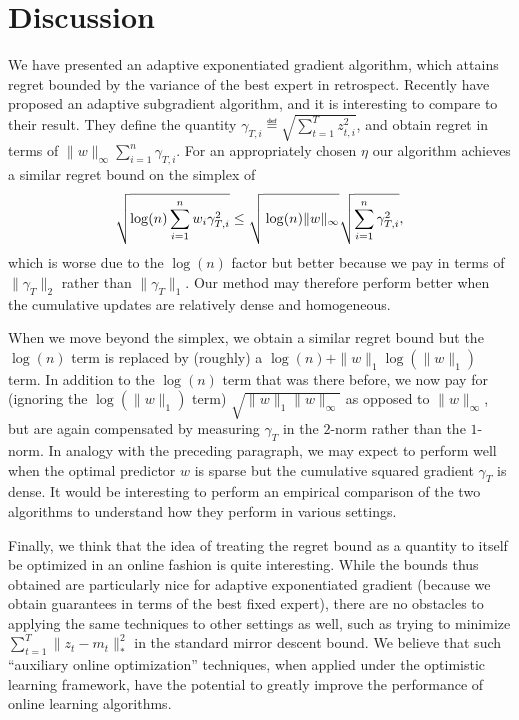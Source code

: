 \documentclass[paper_icml.tex]{subfiles}
\begin{document}
\section{Discussion} 
\label{sec:conclusion}
We have presented an adaptive exponentiated gradient algorithm, 
which attains regret bounded by the variance of the best expert in retrospect. 
Recently \cite{duchi2011adagrad} have proposed an adaptive subgradient algorithm, 
and it is interesting to compare to their result. They define the quantity 
$\gamma_{T,i} \eqdef \sqrt{\sum_{t=1}^T z_{t,i}^2}$, and obtain regret in terms 
of $\|w\|_{\infty} \sum_{i=1}^n \gamma_{T,i}$. For an appropriately chosen 
$\eta$ our algorithm achieves a similar regret bound on the simplex of
\[ \sqrt{\log(n) \sum_{i=1}^n w_i \gamma_{T,i}^2} \leq \sqrt{\vphantom{\sum_{i=1}^n}\log(n)\|w\|_{\infty}}\sqrt{\sum_{i=1}^n \gamma_{T,i}^2}, \]
which is worse due to the $\log(n)$ factor but better because we pay in terms of 
$\|\gamma_T\|_2$ rather than $\|\gamma_T\|_1$. Our method may therefore perform 
better when the cumulative updates are relatively dense and homogeneous.

When we move beyond the simplex, we obtain a similar regret bound but the 
$\log(n)$ term is replaced by (roughly) a $\log(n) + \|w\|_1\log(\|w\|_1)$ term. 
In addition to the $\log(n)$ term that was there before, we now pay for (ignoring 
the $\log(\|w\|_1)$ term) $\sqrt{\|w\|_1\|w\|_{\infty}}$ as opposed to 
$\|w\|_{\infty}$, but are again compensated by measuring $\gamma_T$ in the 
$2$-norm rather than the $1$-norm. In analogy with the preceding paragraph, 
we may expect to perform well when 
the optimal predictor $w$ is sparse but the cumulative squared gradient 
$\gamma_T$ is dense. It would be interesting to perform an empirical comparison 
of the two algorithms to understand how they perform in various settings.

Finally, we think that the idea of treating the regret bound as a quantity to 
itself be optimized in an online fashion is quite interesting. While the bounds 
thus obtained are particularly nice for adaptive exponentiated gradient 
(because we obtain guarantees in terms of the best fixed expert), there are no 
obstacles to applying the same techniques to other settings as well, such 
as trying to minimize $\sum_{t=1}^T \|z_t - m_t\|_*^2$ in the standard mirror 
descent bound. We believe that such ``auxiliary online optimization'' techniques, 
when applied under the optimistic learning framework, have the potential to greatly improve the performance of online learning algorithms.
\end{document}
